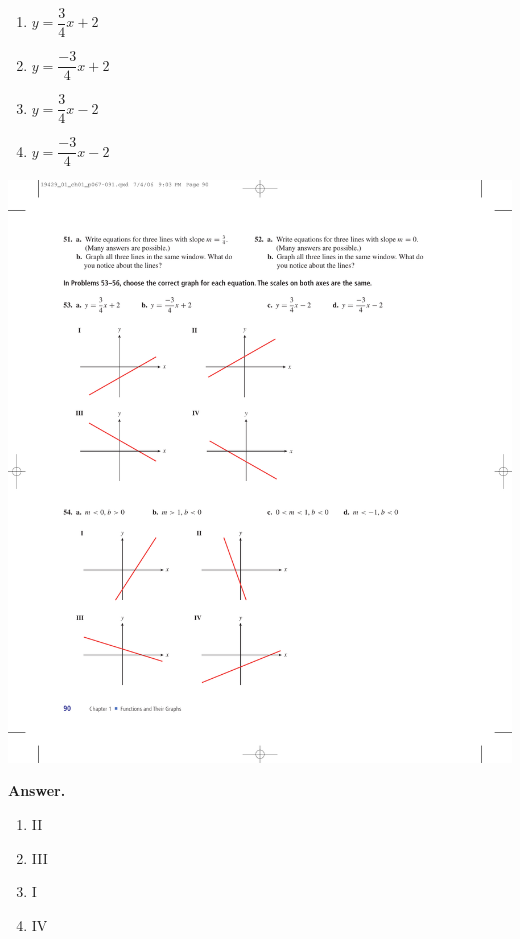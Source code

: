 \documentclass[10pt,]{book}
\theoremstyle{plain}
\theoremstyle{definition}
\theoremstyle{definition}
\theoremstyle{definition}
\theoremstyle{definition}
\numberwithin{equation}{part}
\begin{document}
\begin{exerciselist}
\begin{exercisegroup}
\begin{multicols}{2}
\begin{enumerate}[label=*\alph**]
\item\hypertarget{li-1253}{}\(y = \dfrac{3}{4}x + 2\)%
\item\hypertarget{li-1254}{}\(y = \dfrac{-3}{4}x + 2\)%
\item\hypertarget{li-1255}{}\(y = \dfrac{3}{4}x - 2 \)%
\item\hypertarget{li-1256}{}\(y =\dfrac{-3}{4}x - 2\)%
\end{enumerate}
\end{multicols}
 \includegraphics[width=0.9\linewidth]{images/fig-ex-1-5-53}
%
\par\smallskip
\noindent\textbf{Answer.}\hypertarget{answer-190}{}\quad
\leavevmode%
\begin{multicols}{4}
\begin{enumerate}[label=*\alph**]
\item\hypertarget{li-1257}{}II%
\item\hypertarget{li-1258}{}III%
\item\hypertarget{li-1259}{}I%
\item\hypertarget{li-1260}{}IV%
\end{enumerate}
\end{multicols}
%
\exercise[54.]\hypertarget{exercise-340}{}\leavevmode%

\end{exercisegroup}
\end{exerciselist}
\end{document}
